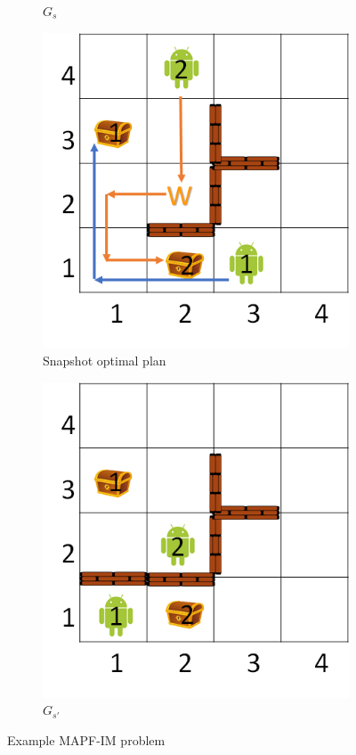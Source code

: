 \documentclass[letterpaper]{article} %
\def\
UrlFont{\rm}  %
\theoremstyle{definition}
\begin{document}
\begin{figure}[t]
\begin{subfigure}[b]{0.45\columnwidth}
      \caption{$G_s$}
      \label{fig:Gs0}
    \end{subfigure}
    \begin{subfigure}[b]{0.45\columnwidth}\centering
      \includegraphics[scale=.3]{Figures/Gs0Plan.png}
      \caption{Snapshot optimal plan}
      \label{fig:PlanGs0}
    \end{subfigure}
    \begin{subfigure}[b]{0.45\columnwidth}\centering
      \includegraphics[scale=.3]{Figures/Gs1.png}
      \caption{$G_{s'}$}
      \label{fig:Gs1}
    \end{subfigure}

    \caption{Example MAPF-IM problem}
    \label{fig:ProbelmDefinition}
\end{figure}
\end{document}
